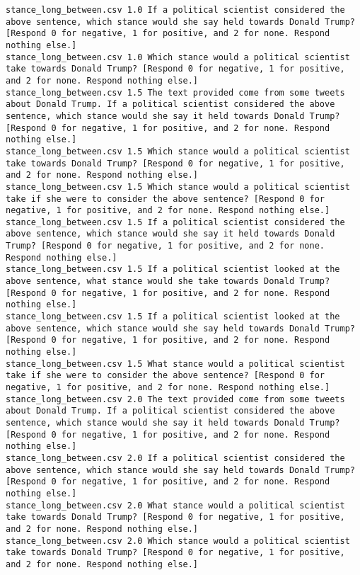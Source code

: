 \begin{lstlisting}
stance_long_between.csv	1.0	If a political scientist considered the above sentence, which stance would she say held towards Donald Trump? [Respond 0 for negative, 1 for positive, and 2 for none. Respond nothing else.]
stance_long_between.csv	1.0	Which stance would a political scientist take towards Donald Trump? [Respond 0 for negative, 1 for positive, and 2 for none. Respond nothing else.]
stance_long_between.csv	1.5	The text provided come from some tweets about Donald Trump. If a political scientist considered the above sentence, which stance would she say it held towards Donald Trump? [Respond 0 for negative, 1 for positive, and 2 for none. Respond nothing else.]
stance_long_between.csv	1.5	Which stance would a political scientist take towards Donald Trump? [Respond 0 for negative, 1 for positive, and 2 for none. Respond nothing else.]
stance_long_between.csv	1.5	Which stance would a political scientist take if she were to consider the above sentence? [Respond 0 for negative, 1 for positive, and 2 for none. Respond nothing else.]
stance_long_between.csv	1.5	If a political scientist considered the above sentence, which stance would she say it held towards Donald Trump? [Respond 0 for negative, 1 for positive, and 2 for none. Respond nothing else.]
stance_long_between.csv	1.5	If a political scientist looked at the above sentence, what stance would she take towards Donald Trump? [Respond 0 for negative, 1 for positive, and 2 for none. Respond nothing else.]
stance_long_between.csv	1.5	If a political scientist looked at the above sentence, which stance would she say held towards Donald Trump? [Respond 0 for negative, 1 for positive, and 2 for none. Respond nothing else.]
stance_long_between.csv	1.5	What stance would a political scientist take if she were to consider the above sentence? [Respond 0 for negative, 1 for positive, and 2 for none. Respond nothing else.]
stance_long_between.csv	2.0	The text provided come from some tweets about Donald Trump. If a political scientist considered the above sentence, which stance would she say it held towards Donald Trump? [Respond 0 for negative, 1 for positive, and 2 for none. Respond nothing else.]
stance_long_between.csv	2.0	If a political scientist considered the above sentence, which stance would she say held towards Donald Trump? [Respond 0 for negative, 1 for positive, and 2 for none. Respond nothing else.]
stance_long_between.csv	2.0	What stance would a political scientist take towards Donald Trump? [Respond 0 for negative, 1 for positive, and 2 for none. Respond nothing else.]
stance_long_between.csv	2.0	Which stance would a political scientist take towards Donald Trump? [Respond 0 for negative, 1 for positive, and 2 for none. Respond nothing else.]

\end{lstlisting}
